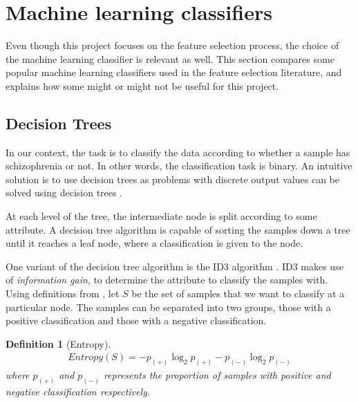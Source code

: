 \documentclass[12pt, twoside, a4paper]{report}
\begin{document}


\section{Machine learning classifiers} \label{bg_ML}
Even though this project focuses on the feature selection process, the choice of the machine learning classifier is relevant as well. This section compares some popular machine learning classifiers used in the feature selection literature, and explains how some might or might not be useful for this project.

\subsection{Decision Trees} \label{bg:ml:decisionTree}
In our context, the task is to classify the data according to whether a sample has schizophrenia or not. In other words, the classification task is binary. An intuitive solution is to use decision trees as problems with discrete output values can be solved using decision trees \cite{RefWorks:98}.

At each level of the tree, the intermediate node is split according to some attribute. A decision tree algorithm is capable of sorting the samples down a tree until it reaches a leaf node, where a classification is given to the node. 

One variant of the decision tree algorithm is the ID3 algorithm \cite{RefWorks:99}. ID3 makes use of  \textit{information gain}, to determine the attribute to classify the samples with. Using definitions from \cite{RefWorks:98}, let $S$ be the set of samples that we want to classify at a particular node. The samples can be separated into two groups, those with a positive classification and those with a negative classification.\\

\newtheorem{mydef}{Definition}[subsection]

\begin{mydef}[Entropy]
\begin{align*}
Entropy(S) = -p_{(+)} \log_2 p_{(+)} - p_{(-)} \log_2 p_{(-)}
\end{align*}
where $p_{(+)}$ and $p_{(-)}$ represents the proportion of samples with positive and negative classification respectively.\\
\end{mydef}
\end{document}
